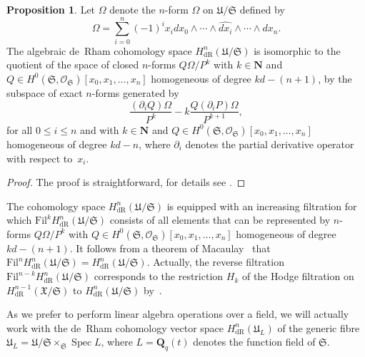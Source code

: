 \documentclass[a4paper,11pt]{article}
\numberwithin{equation}{section}
\newcommand{\NN}{\mathbf{N}} %
\newcommand{\QQ}{\mathbf{Q}} %
\DeclareMathOperator{\Spec}{Spec}        %
\providecommand{\HdR}{H_{\text{dR}}}    %
\theoremstyle{definition}
\newtheorem{prop}[thm]{Proposition}
\begin{document}
\begin{prop}
Let $\Omega$ denote the $n$-form $\Omega$ on $\mathfrak{U}/\mathfrak{S}$ 
defined by 
\begin{equation*}
\Omega = \sum_{i=0}^n (-1)^i x_i d x_0 \wedge \dotsb \wedge \widehat{d x_i} \wedge \dotsb \wedge d x_n.
\end{equation*}
The algebraic de~Rham cohomology space $\HdR^{n}(\mathfrak{U}/\mathfrak{S})$ 
is isomorphic to the quotient of the space of closed $n$-forms 
$Q \Omega / P^k$ with $k \in \NN$ and 
$Q \in H^0(\mathfrak{S},\mathcal{O}_{\mathfrak{S}})[x_0, x_1, \dotsc, x_n]$ 
homogeneous of degree $k d - (n + 1)$, by the subspace of exact $n$-forms 
generated by
\begin{equation*} 
\frac{(\partial_i Q) \Omega}{P^k} - k \frac{Q (\partial_i P) \Omega}{P^{k+1}},
\end{equation*}
for all $0 \leq i \leq n$ and with $k \in \NN$ and 
$Q \in H^0(\mathfrak{S}, \mathcal{O}_{\mathfrak{S}})[x_0, x_1, \dotsc, x_n]$ 
homogeneous of degree $kd-n$, where $\partial_i$ denotes the partial 
derivative operator with respect to~$x_i$.
\end{prop}

\begin{proof}
The proof is straightforward, for details see \citep{Griffiths1969}.
\end{proof}

The cohomology space $\HdR^{n}(\mathfrak{U}/\mathfrak{S})$ is 
equipped with an increasing filtration for which 
$\mbox{Fil}^k \HdR^{n}(\mathfrak{U}/\mathfrak{S})$ consists of all elements 
that can be represented by $n$-forms $Q \Omega / P^k$ with 
$Q \in H^0(\mathfrak{S},\mathcal{O}_{\mathfrak{S}})[x_0, x_1, \dotsc, x_n]$ 
homogeneous of degree $kd - (n + 1)$.  It follows from a theorem of 
Macaulay~\citep[\S 4, (4.11)]{Griffiths1969} that 
$\mbox{Fil}^n \HdR^{n}(\mathfrak{U}/\mathfrak{S}) = \HdR^{n}(\mathfrak{U}/\mathfrak{S})$. 
Actually, the reverse filtration $\mbox{Fil}^{n-k} \HdR^{n}(\mathfrak{U}/\mathfrak{S})$
corresponds to the restriction $H_k$ of the Hodge filtration on 
$\HdR^{n-1}(\mathfrak{X}/\mathfrak{S})$ to $\HdR^{n}(\mathfrak{U}/\mathfrak{S})$ 
by~\citep{Griffiths1969}.

As we prefer to perform linear 
algebra operations over a field, we will actually work with the de~Rham 
cohomology vector space $\HdR^{n}(\mathfrak{U}_L)$ of the generic fibre 
$\mathfrak{U}_L = \mathfrak{U}/\mathfrak{S} \times_{\mathfrak{S}} \Spec{L}$, 
where $L=\QQ_q(t)$ denotes the function field of $\mathfrak{S}$. 
\end{document}

